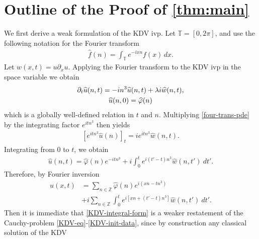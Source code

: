 \documentclass[12pt,reqno]{amsart}
\numberwithin{equation}{section}  %
\numberwithin{figure}{section}
\newcommand{\zz}{\mathbb{Z}}
\newcommand{\ci}{\mathbb{T}}
\newcommand{\wh}{\widehat}
\newcommand{\p}{\partial}
\newcommand{\vp}{\varphi}
\theoremstyle{plain}
\theoremstyle{definition}
\theoremstyle{remark}
\begin{document}
\section{Outline of the Proof of \autoref{thm:main}}
%
%
%
%
%
We first derive a weak formulation of the KDV ivp. 
Let $\ci = [0, 2 \pi]$, and use
the following notation for the Fourier transform
%
%
%
%
\begin{equation*}
	\begin{split}
		\widehat{f}(n) = \int_{\ci} e^{-ix n} f(x) \, dx.
	\end{split}
\end{equation*}
Let $w(x,t) = u \p_x u$. Applying 
the Fourier transform to the KDV ivp in the space variable we obtain 
%
%
\begin{gather}
	\label{four-trans-pde}
	\p_t \widehat{u}(n, t) = -i n^3 \widehat{u}(n, t) + \lambda i  
	\widehat{w} (n, t),
	\\
	\notag
	\widehat{u} (n,0) = \widehat{\vp}(n)
\end{gather}
%
%
which is a globally well-defined relation in $t$ 
and $n$. Multiplying \eqref{four-trans-pde} by the integrating factor $e^{itn^3}$ then yields
\begin{equation*}
	\begin{split}
		\left[ e^{ it n^3} \widehat{u}(n) \right]_t = i
		 e^{ it n^3} \widehat{w} (n, t).	
	\end{split}
\end{equation*}
%
%
Integrating from $0$ to $t$, we obtain
%
%
\begin{equation*}
	\begin{split}
		\wh{u}(n, t) = \wh{\vp}(n) e^{- it n^3} + i  
		\int_0^t e^{ i(t' - t) n^3} \wh{w}(n, t') \ 
		dt'.
	\end{split}
\end{equation*}
%
%
Therefore, by Fourier inversion 
%
%
\begin{equation}
	\label{KDV-integral-form}
	\begin{split}
		u(x,t) & = \sum_{n \in \zz} \wh{\vp}(n) e^{i\left( xn - t n^3 
		\right)} 
		\\
		& + i \sum_{n \in \zz} \int_0^t e^{i\left[ xn + \left( t' - t 
		\right) n^3 \right]} \wh{w}(n, t') \ dt'.
	\end{split}
\end{equation}
%
%
Then it is immediate that \eqref{KDV-integral-form} is a weaker 
restatement of the Cauchy-problem \eqref{KDV-eq}-\eqref{KDV-init-data}, 
since by construction any classical solution of the KDV 
\end{document}

